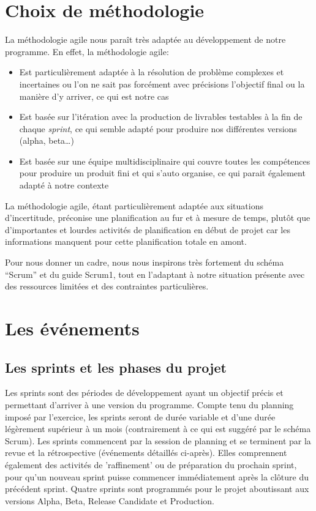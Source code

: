\section{Choix de méthodologie}

La méthodologie agile nous paraît très adaptée au développement de notre programme.
En effet, la méthodologie agile:

\begin{itemize}
    \item  Est particulièrement adaptée à la résolution de problème complexes
          et incertaines ou l’on ne sait pas forcément avec précisions l’objectif
          final ou la manière d’y arriver, ce qui est notre cas
    \item Est basée sur l'itération avec la production de livrables testables
          à la fin de chaque \emph{sprint}, ce qui semble adapté pour produire nos différentes
          versions (alpha, beta…)
    \item Est basée sur une équipe multidisciplinaire qui couvre toutes les compétences
          pour produire un produit fini et qui s’auto organise, ce qui parait également
          adapté à notre contexte
\end{itemize}

La méthodologie agile, étant particulièrement adaptée aux situations d'incertitude, préconise
une planification au fur et à mesure de temps, plutôt que d’importantes et lourdes activités de planification en début de projet car les informations manquent pour cette planification totale en amont.

Pour nous donner un cadre, nous nous inspirons très fortement du schéma “Scrum” et du guide Scrum1, tout en l’adaptant à notre situation présente avec des ressources limitées et des contraintes particulières.

\section{Les événements}

\subsection{Les sprints et les phases du projet}


Les sprints sont des périodes de développement ayant un objectif précis et permettant d'arriver à une version du programme. 
Compte tenu du planning imposé par l’exercice, les sprints seront de durée variable et d'une durée légèrement supérieur à un mois (contrairement à ce qui est suggéré par le schéma Scrum).
Les sprints commencent par la session de planning et se terminent par la revue et la rétrospective (événements détaillés ci-après). Elles comprennent également des activités de 'raffinement' ou de préparation du prochain sprint, pour qu’un nouveau sprint puisse commencer immédiatement après la clôture du précédent sprint.
Quatre sprints sont programmés pour le projet aboutissant aux versions Alpha, Beta, Release Candidate et Production.

